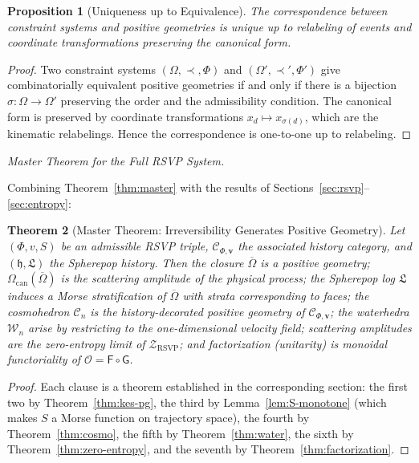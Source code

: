 \documentclass[12pt, oneside]{amsart}
\theoremstyle{plain}
\newtheorem{theorem}{Theorem}[section]
\newtheorem{proposition}[theorem]{Proposition}
\theoremstyle{definition}
\theoremstyle{remark}
\newcommand{\Phif}{\Phi}
\newcommand{\vf}{v}
\newcommand{\Sf}{S}
\newcommand{\OmKS}{\Omega}
\newcommand{\hist}{\mathfrak{h}}
\newcommand{\Log}{\mathfrak{L}}
\newcommand{\Cosmo}{\mathcal{C}_n}
\newcommand{\Water}{\mathcal{W}_n}
\newcommand{\CF}{\Omega_{\mathrm{can}}}
\newcommand{\Ccat}{\mathcal{C}_{\Phi,\mathbf{v}}}
\newcommand{\Gfun}{\mathsf{G}}
\newcommand{\Ffun}{\mathsf{F}}
\newcommand{\Ofun}{\mathcal{O}}
\newcommand{\ZRSVP}{\mathcal{Z}_{\mathrm{RSVP}}}
\begin{document}
\begin{proposition}[Uniqueness up to Equivalence]
The correspondence between constraint systems and positive geometries is unique up to relabeling of events and coordinate transformations preserving the canonical form.
\end{proposition}

\begin{proof}
Two constraint systems $(\OmKS, \prec, \Phif)$ and $(\OmKS', \prec', \Phif')$ give combinatorially equivalent positive geometries if and only if there is a bijection $\sigma: \OmKS \to \OmKS'$ preserving the order and the admissibility condition. The canonical form is preserved by coordinate transformations $x_d \mapsto x_{\sigma(d)}$, which are the kinematic relabelings. Hence the correspondence is one-to-one up to relabeling.
\end{proof}

\medskip\noindent\textit{Master Theorem for the Full RSVP System.}

Combining Theorem~\ref{thm:master} with the results of Sections~\ref{sec:rsvp}--\ref{sec:entropy}:

\begin{theorem}[Master Theorem: Irreversibility Generates Positive Geometry]
Let $(\Phif, \vf, \Sf)$ be an admissible RSVP triple, $\Ccat$ the associated history category, and $(\hist, \Log)$ the Spherepop history. Then the closure $\overline{\OmKS}$ is a positive geometry; $\CF(\overline{\OmKS})$ is the scattering amplitude of the physical process; the Spherepop log $\Log$ induces a Morse stratification of $\overline{\OmKS}$ with strata corresponding to faces; the cosmohedron $\Cosmo$ is the history-decorated positive geometry of $\Ccat$; the waterhedra $\Water$ arise by restricting to the one-dimensional velocity field; scattering amplitudes are the zero-entropy limit of $\ZRSVP$; and factorization (unitarity) is monoidal functoriality of $\Ofun = \Ffun \circ \Gfun$.
\end{theorem}

\begin{proof}
Each clause is a theorem established in the corresponding section: the first two by Theorem~\ref{thm:kes-pg}, the third by Lemma~\ref{lem:S-monotone} (which makes $\Sf$ a Morse function on trajectory space), the fourth by Theorem~\ref{thm:cosmo}, the fifth by Theorem~\ref{thm:water}, the sixth by Theorem~\ref{thm:zero-entropy}, and the seventh by Theorem~\ref{thm:factorization}.
\end{proof}
\end{document}
